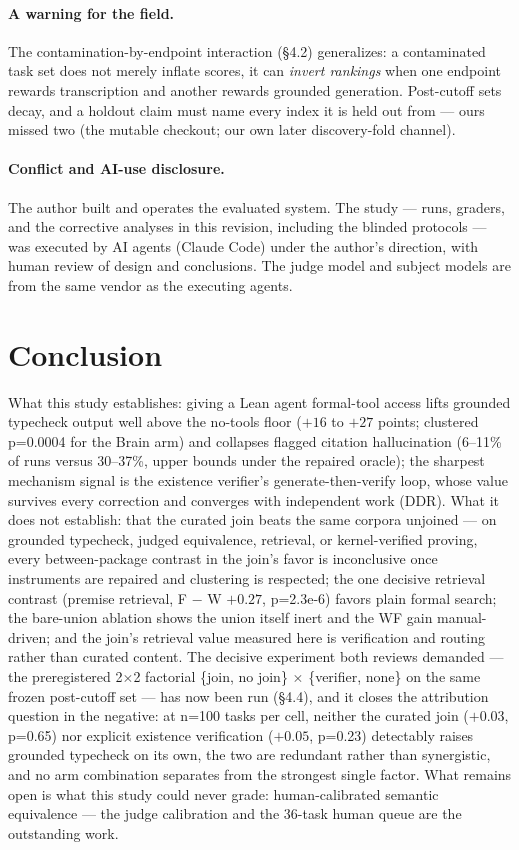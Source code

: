 \documentclass[10pt]{article}
\begin{document}
\paragraph{A warning for the field.} The contamination-by-endpoint
interaction (\S 4.2) generalizes: a contaminated task set does not
merely inflate scores, it can \emph{invert rankings} when one endpoint
rewards transcription and another rewards grounded generation.
Post-cutoff sets decay, and a holdout claim must name every index it is
held out from --- ours missed two (the mutable checkout; our own later
discovery-fold channel).

\paragraph{Conflict and AI-use disclosure.} The author built and
operates the evaluated system. The study --- runs, graders, and the
corrective analyses in this revision, including the blinded
protocols --- was executed by AI agents (Claude Code) under the author's
direction, with human review of design and conclusions. The judge model
and subject models are from the same vendor as the executing agents.

\section{Conclusion}\label{sec:conclusion}

What this study establishes: giving a Lean agent formal-tool access
lifts grounded typecheck output well above the no-tools floor ($+16$ to
$+27$ points; clustered p=0.0004 for the Brain arm) and collapses
flagged citation hallucination (6--11\% of runs versus 30--37\%, upper
bounds under the repaired oracle); the sharpest mechanism signal is the
existence verifier's generate-then-verify loop, whose value survives
every correction and converges with independent work (DDR). What it does
not establish: that the curated join beats the same corpora unjoined ---
on grounded typecheck, judged equivalence, retrieval, or kernel-verified
proving, every between-package contrast in the join's favor is
inconclusive once instruments are repaired and clustering is respected;
the one decisive retrieval contrast (premise retrieval, F $-$ W $+0.27$,
p=2.3e-6) favors plain formal search; the bare-union ablation shows the
union itself inert and the WF gain manual-driven; and the join's
retrieval value measured here is verification and routing rather than
curated content. The decisive experiment both reviews demanded --- the
preregistered 2$\times$2 factorial \{join, no join\} $\times$
\{verifier, none\} on the same frozen post-cutoff set --- has now been
run (\S 4.4), and it closes the attribution question in the negative:
at n=100 tasks per cell, neither the curated join ($+0.03$, p=0.65)
nor explicit existence verification ($+0.05$, p=0.23) detectably
raises grounded typecheck on its own, the two are redundant rather
than synergistic, and no arm combination separates from the strongest
single factor. What remains open is what this study could never grade:
human-calibrated semantic equivalence --- the judge calibration and
the 36-task human queue are the outstanding work.
\end{document}
